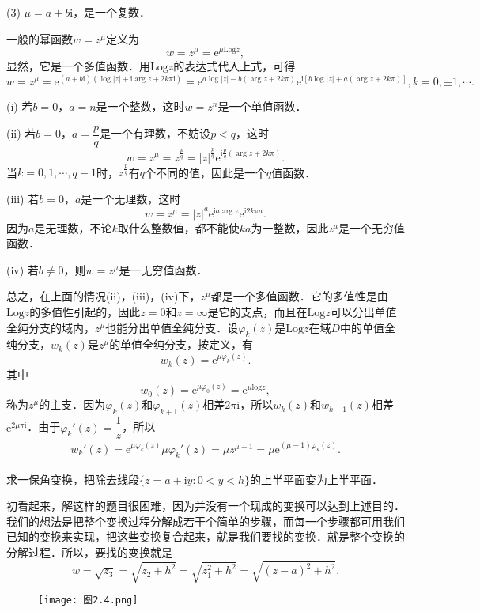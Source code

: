\documentclass[../../main.tex]{subfiles}
\begin{document}
(3) $\mu = a + b\text{i}$，是一个复数．

一般的幂函数$w = z^\mu$定义为
\[
w = z^\mu = \text{e}^{\mu \text{Log} z},
\]
显然，它是一个多值函数．用$\text{Log} z$的表达式代入上式，可得
\[
w = z^\mu = \text{e}^{(a + b\text{i})(\log |z| + \text{i}\arg z + 2k\pi \text{i})}
= \text{e}^{a\log |z| - b(\arg z + 2k\pi)} \text{e}^{\text{i}[b\log |z| + a(\arg z + 2k\pi)]},
k = 0, \pm 1, \cdots.
\]

(i) 若$b = 0$，$a = n$是一个整数，这时$w = z^n$是一个单值函数．

(ii) 若$b = 0$，$a = \dfrac{p}{q}$是一个有理数，不妨设$p < q$，这时
\[
w = z^\mu = z^{\frac{p}{q}} = |z|^{\frac{p}{q}} \text{e}^{\text{i}\frac{p}{q}(\arg z + 2k\pi)}.
\]
当$k = 0,1,\cdots,q - 1$时，$z^{\frac{p}{q}}$有$q$个不同的值，因此是一个$q$值函数．

(iii) 若$b = 0$，$a$是一个无理数，这时
\[
w = z^\mu = |z|^a \text{e}^{\text{i}a\arg z} \text{e}^{\text{i}2k\pi a}.
\]
因为$a$是无理数，不论$k$取什么整数值，都不能使$ka$为一整数，因此$z^a$是一个无穷值函数．

(iv) 若$b \neq 0$，则$w = z^\mu$是一无穷值函数．

总之，在上面的情况(ii)，(iii)，(iv)下，$z^\mu$都是一个多值函数．它的多值性是由$\text{Log} z$的多值性引起的，因此$z = 0$和$z = \infty$是它的支点，而且在$\text{Log} z$可以分出单值全纯分支的域内，$z^\mu$也能分出单值全纯分支．设$\varphi_k(z)$是$\text{Log} z$在域$D$中的单值全纯分支，$w_k(z)$是$z^\mu$的单值全纯分支，按定义，有
\[
w_k(z) = \text{e}^{\mu \varphi_k(z)}.
\]
其中
\[
w_0(z) = \text{e}^{\mu \varphi_0(z)} = \text{e}^{\mu \text{log} z},
\]
称为$z^\mu$的主支．因为$\varphi_k(z)$和$\varphi_{k + 1}(z)$相差$2\pi \text{i}$，所以$w_k(z)$和$w_{k + 1}(z)$相差$\text{e}^{2\mu \pi \text{i}}$．由于$\varphi_k'(z) = \dfrac{1}{z}$，所以
\begin{align}\label{equation:幂函数求导}
w_k'(z) = \text{e}^{\mu \varphi_k(z)} \mu \varphi_k'(z)
= \mu z^{\mu - 1}
= \mu \text{e}^{(\mu - 1)\varphi_k(z)}.
\end{align}

\begin{example}\label{example:例2.4.5}
求一保角变换，把除去线段$\{ z = a + \text{i}y: 0 < y < h \}$的上半平面变为上半平面．
\end{example}
\begin{solution}
初看起来，解这样的题目很困难，因为并没有一个现成的变换可以达到上述目的．我们的想法是把整个变换过程分解成若干个简单的步骤，而每一个步骤都可用我们已知的变换来实现，把这些变换复合起来，就是我们要找的变换．就是整个变换的分解过程．所以，要找的变换就是
\[
w = \sqrt{z_3}
= \sqrt{z_2 + h^2}
= \sqrt{z_1^2 + h^2}
= \sqrt{(z - a)^2 + h^2}.
\]
\begin{figure}[H]
\centering
\texttt{[image: 图2.4.png]}
\caption{}
\label{figure:图2.4}
\end{figure}

\end{solution}
\end{document}
